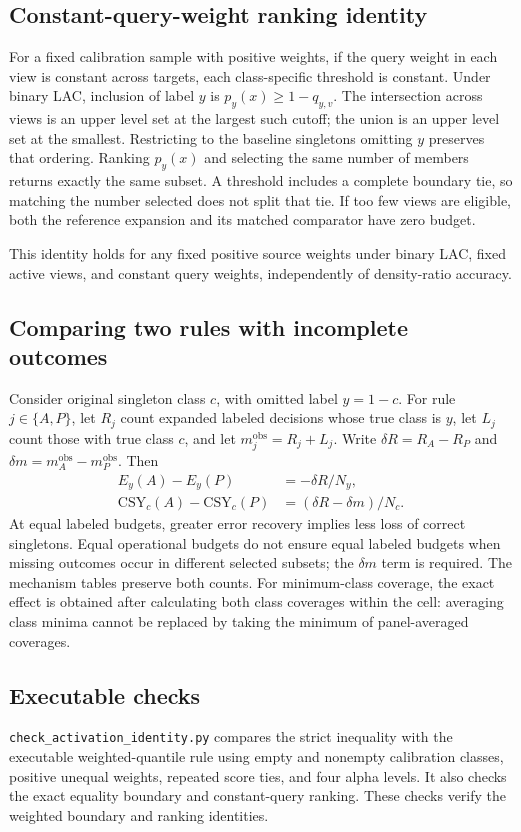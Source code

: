 \subsection{Constant-query-weight ranking identity}
For a fixed calibration sample with positive weights, if the query weight in each view is constant across targets, each class-specific threshold is constant. Under binary LAC, inclusion of label $y$ is $p_y(x)\ge1-q_{y,v}$. The intersection across views is an upper level set at the largest such cutoff; the union is an upper level set at the smallest. Restricting to the baseline singletons omitting $y$ preserves that ordering. Ranking $p_y(x)$ and selecting the same number of members returns exactly the same subset. A threshold includes a complete boundary tie, so matching the number selected does not split that tie. If too few views are eligible, both the reference expansion and its matched comparator have zero budget.

This identity holds for any fixed positive source weights under binary LAC, fixed active views, and constant query weights, independently of density-ratio accuracy.

\subsection{Comparing two rules with incomplete outcomes}
Consider original singleton class $c$, with omitted label $y=1-c$. For rule $j\in\{A,P\}$, let $R_j$ count expanded labeled decisions whose true class is $y$, let $L_j$ count those with true class $c$, and let $m_j^{\mathrm{obs}}=R_j+L_j$. Write $\delta R=R_A-R_P$ and $\delta m=m_A^{\mathrm{obs}}-m_P^{\mathrm{obs}}$. Then
\begin{align}
 E_y(A)-E_y(P)&=-\delta R/N_y,\\
 \mathrm{CSY}_c(A)-\mathrm{CSY}_c(P)&=(\delta R-\delta m)/N_c.
\end{align}
At equal labeled budgets, greater error recovery implies less loss of correct singletons. Equal operational budgets do not ensure equal labeled budgets when missing outcomes occur in different selected subsets; the $\delta m$ term is required. The mechanism tables preserve both counts. For minimum-class coverage, the exact effect is obtained after calculating both class coverages within the cell: averaging class minima cannot be replaced by taking the minimum of panel-averaged coverages.

\subsection{Executable checks}
\texttt{check\_activation\_identity.py} compares the strict inequality with the executable weighted-quantile rule using empty and nonempty calibration classes, positive unequal weights, repeated score ties, and four alpha levels. It also checks the exact equality boundary and constant-query ranking. These checks verify the weighted boundary and ranking identities.

